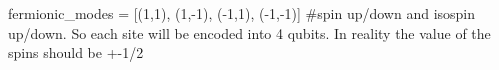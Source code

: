 fermionic_modes = [(1,1), (1,-1), (-1,1), (-1,-1)] #spin up/down and isospin up/down. So each site will be encoded into 4 qubits. In reality the value of the spins should be +-1/2